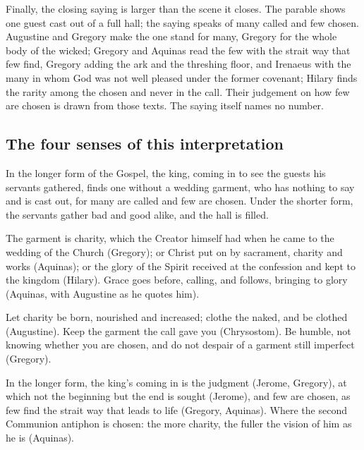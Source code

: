 Finally, the closing saying is larger than the scene it closes. The parable
shows one guest cast out of a full hall; the saying speaks of many called and
few chosen. Augustine and Gregory make the one stand for many, Gregory for the
whole body of the wicked; Gregory and Aquinas read the few with the strait way
that few find, Gregory adding the ark and the threshing floor, and Irenaeus
with the many in whom God was not well pleased under the former covenant;
Hilary finds the rarity among the chosen and never in the call. Their judgement
on how few are chosen is drawn from those texts. The saying itself names no
number.

\subsection{The four senses of this interpretation}

\begin{fourSenses}
\item[Literal.] In the longer form of the Gospel, the king, coming in to see
the guests his servants gathered, finds one without a wedding garment, who has
nothing to say and is cast out, for many are called and few are chosen. Under
the shorter form, the servants gather bad and good alike, and the hall is
filled.

\item[Allegorical.] The garment is charity, which the Creator himself had when
he came to the wedding of the Church (Gregory); or Christ put on by sacrament,
charity and works (Aquinas); or the glory of the Spirit received at the
confession and kept to the kingdom (Hilary). Grace goes before, calling, and
follows, bringing to glory (Aquinas, with Augustine as he quotes him).

\item[Moral.] Let charity be born, nourished and increased; clothe the naked,
and be clothed (Augustine). Keep the garment the call gave you (Chrysostom).
Be humble, not knowing whether you are chosen, and do not despair of a garment
still imperfect (Gregory).

\item[Anagogical.] In the longer form, the king's coming in is the judgment
(Jerome, Gregory), at
which not the beginning but the end is sought (Jerome), and few are chosen,
as few find the strait way that leads to life (Gregory, Aquinas). Where the second
Communion antiphon is chosen: the more charity, the fuller the vision of him as
he is (Aquinas).
\end{fourSenses}
